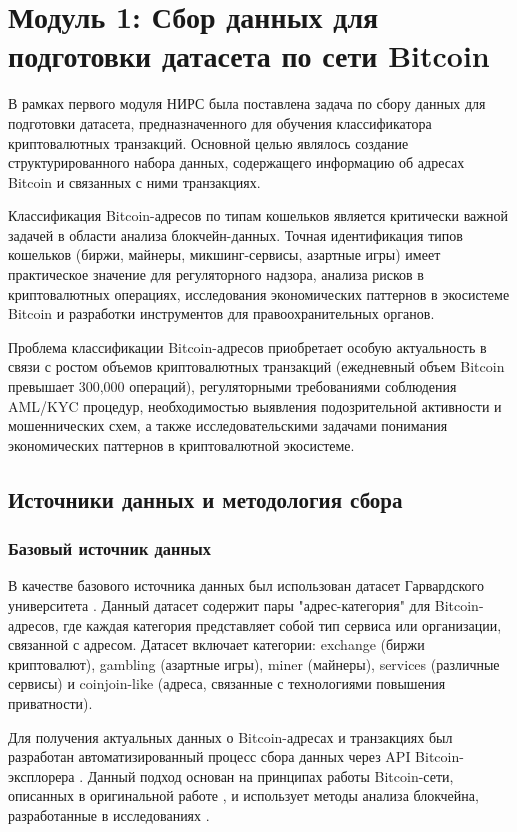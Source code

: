 \section{Модуль 1: Сбор данных для подготовки датасета по сети Bitcoin}

В рамках первого модуля НИРС была поставлена задача по сбору данных для подготовки датасета, предназначенного для обучения классификатора криптовалютных транзакций. Основной целью являлось создание структурированного набора данных, содержащего информацию об адресах Bitcoin и связанных с ними транзакциях.

Классификация Bitcoin-адресов по типам кошельков является критически важной задачей в области анализа блокчейн-данных. Точная идентификация типов кошельков (биржи, майнеры, микшинг-сервисы, азартные игры) имеет практическое значение для регуляторного надзора, анализа рисков в криптовалютных операциях, исследования экономических паттернов в экосистеме Bitcoin и разработки инструментов для правоохранительных органов.

Проблема классификации Bitcoin-адресов приобретает особую актуальность в связи с ростом объемов криптовалютных транзакций (ежедневный объем Bitcoin превышает 300,000 операций), регуляторными требованиями соблюдения AML/KYC процедур, необходимостью выявления подозрительной активности и мошеннических схем, а также исследовательскими задачами понимания экономических паттернов в криптовалютной экосистеме.

\subsection{Источники данных и методология сбора}

\subsubsection{Базовый источник данных}

В качестве базового источника данных был использован датасет Гарвардского университета \cite{harvard_dataset}. Данный датасет содержит пары "адрес-категория" для Bitcoin-адресов, где каждая категория представляет собой тип сервиса или организации, связанной с адресом. Датасет включает категории: exchange (биржи криптовалют), gambling (азартные игры), miner (майнеры), services (различные сервисы) и coinjoin-like (адреса, связанные с технологиями повышения приватности).

Для получения актуальных данных о Bitcoin-адресах и транзакциях был разработан автоматизированный процесс сбора данных через API Bitcoin-эксплорера \cite{bitcoin_explorer_api}\cite{walletexplorer_api}. Данный подход основан на принципах работы Bitcoin-сети, описанных в оригинальной работе \cite{bitcoin_whitepaper}, и использует методы анализа блокчейна, разработанные в исследованиях \cite{blockchain_analysis_survey, bitcoin_privacy_analysis, bitcoin_clustering}.

